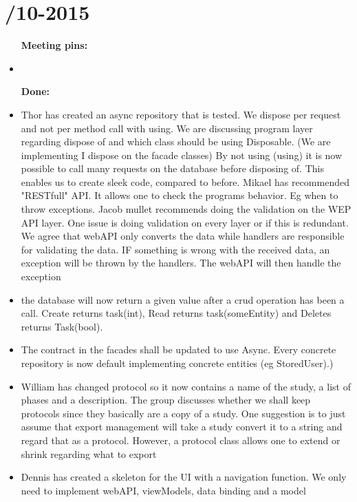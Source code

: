 \section{/10-2015} %
\attend{\at}{\at}{\at}{\at}


\begin{itemize}
	\item [\textbf{Meeting pins:}]
	\item 
\end{itemize}

\begin{itemize}
	\item [\textbf{Done:}]
	\item Thor has created an async repository that is tested. We dispose per request and not per method call with using. We are discussing program layer regarding dispose of and which class should be using Disposable. (We are implementing I dispose on the facade classes) By not using (using) it is now possible to call many requests on the database before disposing of. This enables us to create sleek code, compared to before. Mikael has recommended "RESTfull" API. It allows one to check the programs behavior. Eg when to throw exceptions. Jacob mullet recommends doing the validation on the WEP API layer. One issue is doing validation on every layer or if this is redundant. We agree that webAPI only converts the data while handlers are responsible for validating the data. IF something is wrong with the received data, an exception will be thrown by the handlers. The webAPI will then handle the exception
	\item the database will now return a given value after a crud operation has been a call. Create returns task(int), Read returns task(someEntity) and Deletes returns Task(bool).
	\item The contract in the facades shall be updated to use Async. Every concrete repository is now default implementing concrete entities (eg StoredUser).)
	\item William has changed protocol so it now contains a name of the study, a list of phases and a description. The group discusses whether we shall keep protocols since they basically  are a copy of a study. One suggestion is to just assume that export management will take a study convert it to a string and regard that as a protocol. However, a protocol class allows one to extend or shrink regarding what to export
	\item Dennis has created a skeleton for the UI with a navigation function. We only need to implement webAPI, viewModels, data binding and a model

\end{itemize}
